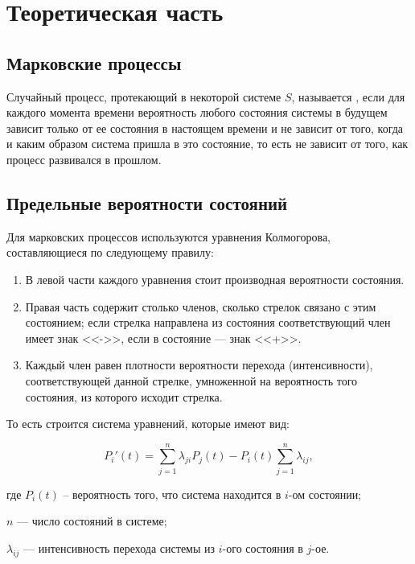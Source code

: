 \chapter{Теоретическая часть}

\section{Марковские процессы}

Случайный процесс, протекающий в некоторой системе $S$, называется
, если для каждого момента времени вероятность любого состояния
системы в будущем зависит только от ее состояния в настоящем времени и не
зависит от того, когда и каким образом система пришла в это состояние, то есть
не зависит от того, как процесс развивался в прошлом.

\section{Предельные вероятности состояний}

Для марковских процессов используются уравнения Колмогорова, составляющиеся по
следующему правилу:

\begin{enumerate}
    \item В левой части каждого уравнения стоит производная вероятности
        состояния.
    \item Правая часть содержит столько членов, сколько стрелок связано с этим
        состоянием; если стрелка направлена из состояния соответствующий член
        имеет знак <<->>, если в состояние --- знак <<+>>.
    \item Каждый член равен плотности вероятности перехода (интенсивности),
        соответствующей данной стрелке, умноженной на вероятность того состояния,
        из которого исходит стрелка.
\end{enumerate}

То есть строится система уравнений, которые имеют вид:

\begin{equation}
    P_i'(t) = \sum\limits_{j=1}^{n} \lambda_{ji}P_j(t) - P_i(t)
    \sum\limits_{j=1}^{n} \lambda_{ij},
\end{equation}

где $P_i(t)$ -- вероятность того, что система находится в $i$-ом состоянии;

$n$ --- число состояний в системе;

$\lambda_{ij}$ --- интенсивность перехода системы из $i$-ого состояния в $j$-ое.

